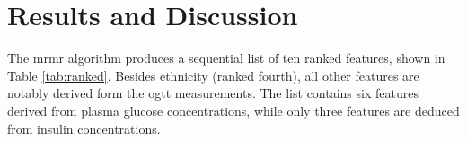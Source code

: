 \documentclass[journal,comsoc]{IEEEtran}
\renewcommand{\^}{\hat}  %
\begin{document}
\section{Results and Discussion}
%
%
The \ac{mrmr} algorithm produces a sequential list of ten ranked features, shown in Table \ref{tab:ranked}. Besides ethnicity (ranked fourth), all other features are notably derived form the \ac{ogtt} measurements. The list contains six features derived from plasma glucose concentrations, while only three features are deduced from insulin concentrations.
%
\end{document}
